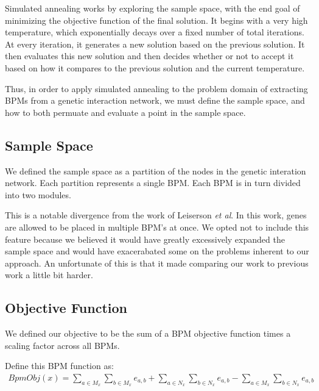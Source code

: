 \documentclass[11pt]{article}
\begin{document}
\par Simulated annealing works by exploring the sample space, with the end goal of minimizing the objective function of the final solution. It begins with a very high temperature, which exponentially decays over a fixed number of total iterations. At every iteration, it generates a new solution based on the previous solution. It then  evaluates this new solution and then decides whether or not to accept it based on how it compares to the previous solution and the current temperature.

\par Thus, in order to apply simulated annealing to the problem domain of extracting BPMs from a genetic interaction network, we must define the sample space, and how to both permuate and evaluate a point in the sample space. 



\subsection{Sample Space}
\par We defined the sample space as a partition of the nodes in the genetic interation network. Each partition represents a single BPM. Each BPM is in turn divided into two modules.

\par This is a notable divergence from the work of Leiserson \textit{et al}. In this work, genes are allowed to be placed in multiple BPM's at once. We opted not to include this feature because we believed it would have greatly excessively expanded the sample space and would have exacerabated some on the problems inherent to our approach. An unfortunate of this is that it made comparing our work to previous work a little bit harder. 


\subsection{Objective Function}
We defined our objective to be the sum of a BPM objective function times a scaling factor across all BPMs. 

Define this BPM function as:
\begin{align}
Bpm Obj(x) = \sum_{a \in M_x}^{}  \sum_{b \in M_x}^{} e_{a, b}  
		   + \sum_{a \in N_x}^{}  \sum_{b \in N_x}^{} e_{a, b}  
		   - \sum_{a \in M_x}^{}  \sum_{b \in N_x}^{} e_{a, b}              
\end{align}
\end{document}
